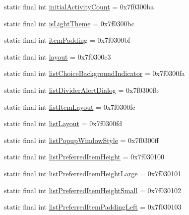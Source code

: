 \begin{DoxyCompactItemize}
\item 
static final int \mbox{\hyperlink{classcom_1_1google_1_1android_1_1gms_1_1R_1_1attr_afe414191178d4fbeebf75186868371ad}{initial\+Activity\+Count}} = 0x7f0300ba
\item 
static final int \mbox{\hyperlink{classcom_1_1google_1_1android_1_1gms_1_1R_1_1attr_a4cae3f14f1b20bc99eb140e0b303f203}{is\+Light\+Theme}} = 0x7f0300bc
\item 
static final int \mbox{\hyperlink{classcom_1_1google_1_1android_1_1gms_1_1R_1_1attr_a1d46ec4cc5fa756f985bc1ebd12bddde}{item\+Padding}} = 0x7f0300bf
\item 
static final int \mbox{\hyperlink{classcom_1_1google_1_1android_1_1gms_1_1R_1_1attr_a28365419e1e95e623c6d98cacb9d45b1}{layout}} = 0x7f0300c3
\item 
static final int \mbox{\hyperlink{classcom_1_1google_1_1android_1_1gms_1_1R_1_1attr_a8f724d03e712e0a623bf953517c6015f}{list\+Choice\+Background\+Indicator}} = 0x7f0300fa
\item 
static final int \mbox{\hyperlink{classcom_1_1google_1_1android_1_1gms_1_1R_1_1attr_a9b4c693c2c995d56cee8f74320d8773a}{list\+Divider\+Alert\+Dialog}} = 0x7f0300fb
\item 
static final int \mbox{\hyperlink{classcom_1_1google_1_1android_1_1gms_1_1R_1_1attr_afa2e8f23da31bb9487482b20a91acb12}{list\+Item\+Layout}} = 0x7f0300fc
\item 
static final int \mbox{\hyperlink{classcom_1_1google_1_1android_1_1gms_1_1R_1_1attr_a9586e5fd454825cbdfea37d967298b3b}{list\+Layout}} = 0x7f0300fd
\item 
static final int \mbox{\hyperlink{classcom_1_1google_1_1android_1_1gms_1_1R_1_1attr_a35ae7e815b43712a85339cf18cd8b757}{list\+Popup\+Window\+Style}} = 0x7f0300ff
\item 
static final int \mbox{\hyperlink{classcom_1_1google_1_1android_1_1gms_1_1R_1_1attr_af8ffc4d9a97e8045b4ec56d1fcbbe2e4}{list\+Preferred\+Item\+Height}} = 0x7f030100
\item 
static final int \mbox{\hyperlink{classcom_1_1google_1_1android_1_1gms_1_1R_1_1attr_a17f88d03025bb5eb1e87997115cc4031}{list\+Preferred\+Item\+Height\+Large}} = 0x7f030101
\item 
static final int \mbox{\hyperlink{classcom_1_1google_1_1android_1_1gms_1_1R_1_1attr_ad7d5d850b7dae07db1348d3a678eefc7}{list\+Preferred\+Item\+Height\+Small}} = 0x7f030102
\item 
static final int \mbox{\hyperlink{classcom_1_1google_1_1android_1_1gms_1_1R_1_1attr_a74a91e9d8d9e62b921f236eca8df9e36}{list\+Preferred\+Item\+Padding\+Left}} = 0x7f030103

\end{DoxyCompactItemize}

